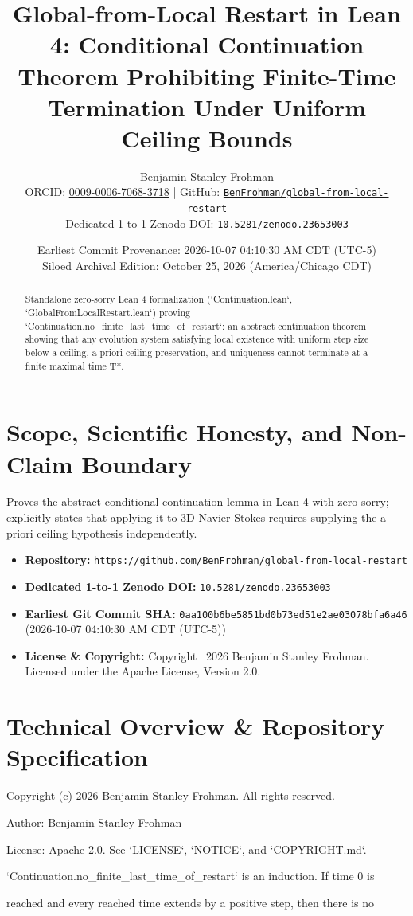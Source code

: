 \documentclass[11pt,a4paper]{article}
\title{\textbf{Global-from-Local Restart in Lean 4: Conditional Continuation Theorem Prohibiting Finite-Time Termination Under Uniform Ceiling Bounds}}
\author{Benjamin Stanley Frohman\\
\small ORCID: \href{https://orcid.org/0009-0006-7068-3718}{0009-0006-7068-3718} \quad|\quad
GitHub: \href{https://github.com/BenFrohman/global-from-local-restart}{\texttt{BenFrohman/global-from-local-restart}}\\
\small Dedicated 1-to-1 Zenodo DOI: \href{https://doi.org/10.5281/zenodo.23653003}{\texttt{10.5281/zenodo.23653003}}}
\date{Earliest Commit Provenance: 2026-10-07 04:10:30 AM CDT (UTC-5)\\
Siloed Archival Edition: October 25, 2026 (America/Chicago CDT)}
\begin{document}
\maketitle

\begin{abstract}
Standalone zero-sorry Lean 4 formalization (`Continuation.lean`, `GlobalFromLocalRestart.lean`) proving `Continuation.no\_finite\_last\_time\_of\_restart`: an abstract continuation theorem showing that any evolution system satisfying local existence with uniform step size below a ceiling, a priori ceiling preservation, and uniqueness cannot terminate at a finite maximal time T*.
\end{abstract}

\section{Scope, Scientific Honesty, and Non-Claim Boundary}
Proves the abstract conditional continuation lemma in Lean 4 with zero sorry; explicitly states that applying it to 3D Navier-Stokes requires supplying the a priori ceiling hypothesis independently.

\begin{itemize}
  \item \textbf{Repository:} \texttt{https://github.com/BenFrohman/global-from-local-restart}
  \item \textbf{Dedicated 1-to-1 Zenodo DOI:} \texttt{10.5281/zenodo.23653003}
  \item \textbf{Earliest Git Commit SHA:} \texttt{0aa100b6be5851bd0b73ed51e2ae03078bfa6a46} (2026-10-07 04:10:30 AM CDT (UTC-5))
  \item \textbf{License \& Copyright:} Copyright \textcopyright\ 2026 Benjamin Stanley Frohman. Licensed under the Apache License, Version 2.0.
\end{itemize}

\section{Technical Overview \& Repository Specification}
Copyright (c) 2026 Benjamin Stanley Frohman. All rights reserved.

Author: Benjamin Stanley Frohman

License: Apache-2.0. See `LICENSE`, `NOTICE`, and `COPYRIGHT.md`.

`Continuation.no\_finite\_last\_time\_of\_restart` is an induction. If time 0 is

reached and every reached time extends by a positive step, then there is no
\end{document}
